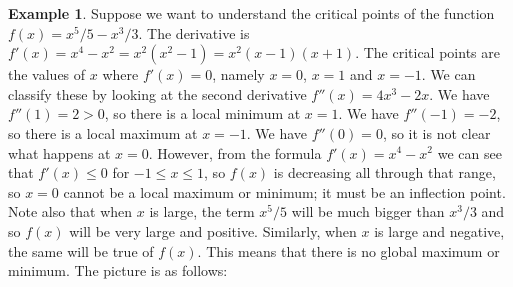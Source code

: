 \documentclass[reqno]{amsart}
\theoremstyle{definition}
\newtheorem{example}[theorem]{Example}
\begin{document}
\begin{example}
 Suppose we want to understand the critical points of the function
 $f(x)=x^5/5-x^3/3$.  The derivative is
 $f'(x)=x^4-x^2=x^2(x^2-1)=x^2(x-1)(x+1)$.  The critical points are
 the values of $x$ where $f'(x)=0$, namely $x=0$, $x=1$ and $x=-1$.
 We can classify these by looking at the second derivative
 $f''(x)=4x^3-2x$.  We have $f''(1)=2>0$, so there is a local minimum
 at $x=1$.  We have $f''(-1)=-2$, so there is a local maximum at
 $x=-1$.  We have $f''(0)=0$, so it is not clear what happens at
 $x=0$.  However, from the formula $f'(x)=x^4-x^2$ we can see that
 $f'(x)\leq 0$ for $-1\leq x\leq 1$, so $f(x)$ is decreasing all
 through that range, so $x=0$ cannot be a local maximum or minimum; it
 must be an inflection point.  Note also that when $x$ is large, the
 term $x^5/5$ will be much bigger than $x^3/3$ and so $f(x)$ will be
 very large and positive.  Similarly, when $x$ is large and negative,
 the same will be true of $f(x)$.  This means that there is no global
 maximum or minimum.  The picture is as follows:
 \begin{center}
 \end{center} 
\end{example}
\end{document}
